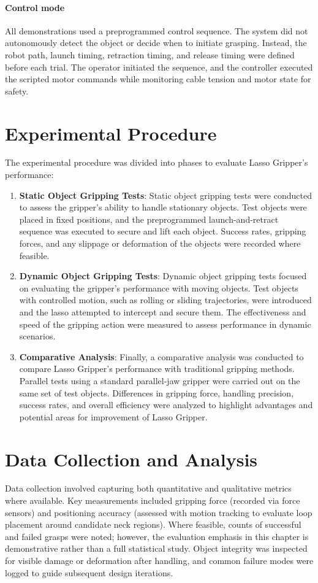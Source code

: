 \paragraph{Control mode}
All demonstrations used a preprogrammed control sequence. The system did not autonomously detect the object or decide when to initiate grasping. Instead, the robot path, launch timing, retraction timing, and release timing were defined before each trial. The operator initiated the sequence, and the controller executed the scripted motor commands while monitoring cable tension and motor state for safety.
\section{Experimental Procedure}
The experimental procedure was divided into phases to evaluate Lasso Gripper's performance:
\begin{enumerate}
    \item \textbf{Static Object Gripping Tests}: Static object gripping tests were conducted to assess the gripper's ability to handle stationary objects. Test objects were placed in fixed positions, and the preprogrammed launch-and-retract sequence was executed to secure and lift each object. Success rates, gripping forces, and any slippage or deformation of the objects were recorded where feasible.

\item \textbf{Dynamic Object Gripping Tests}: Dynamic object gripping tests focused on evaluating the gripper's performance with moving objects. Test objects with controlled motion, such as rolling or sliding trajectories, were introduced and the lasso attempted to intercept and secure them. The effectiveness and speed of the gripping action were measured to assess performance in dynamic scenarios.

\item \textbf{Comparative Analysis}: Finally, a comparative analysis was conducted to compare Lasso Gripper's performance with traditional gripping methods. Parallel tests using a standard parallel-jaw gripper were carried out on the same set of test objects. Differences in gripping force, handling precision, success rates, and overall efficiency were analyzed to highlight advantages and potential areas for improvement of Lasso Gripper.
\end{enumerate}


\section{Data Collection and Analysis}
Data collection involved capturing both quantitative and qualitative metrics where available. Key measurements included gripping force (recorded via force sensors) and positioning accuracy (assessed with motion tracking to evaluate loop placement around candidate neck regions). Where feasible, counts of successful and failed grasps were noted; however, the evaluation emphasis in this chapter is demonstrative rather than a full statistical study. Object integrity was inspected for visible damage or deformation after handling, and common failure modes were logged to guide subsequent design iterations.

